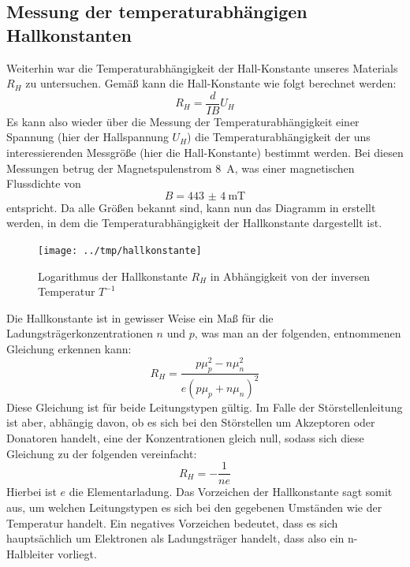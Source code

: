 \subsection{Messung der temperaturabhängigen Hallkonstanten}

Weiterhin war die Temperaturabhängigkeit der Hall-Konstante unseres Materials
$R_H$ zu untersuchen. Gemäß \cite[Gl. (XIV.2)]{ibach} kann die Hall-Konstante
wie folgt berechnet werden: 
\begin{equation}
R_H = \frac{d}{I B} U_H
\end{equation}
Es kann also wieder über die Messung der Temperaturabhängigkeit einer Spannung
(hier der Hallspannung $U_H$) die Temperaturabhängigkeit der uns
interessierenden Messgröße (hier die Hall-Konstante) bestimmt werden. Bei
diesen Messungen betrug der Magnetspulenstrom \SI{8}{\ampere}, was einer
magnetischen Flussdichte von
\begin{equation}
 B=\SI{443(4)}{\milli\tesla}
\end{equation}
entspricht.
Da alle Größen bekannt sind, kann nun das Diagramm in 
erstellt werden, in dem die Temperaturabhängigkeit der Hallkonstante dargestellt ist.
\begin{figure}[htb]
   \centering
   \texttt{[image: ../tmp/hallkonstante]}
   \caption{Logarithmus der Hallkonstante $R_H$ in Abhängigkeit von der inversen Temperatur $T^{-1}$}
   \label{fig:hallkonstante}
\end{figure}

Die Hallkonstante ist in gewisser Weise ein Maß für die
Ladungsträgerkonzentrationen $n$ und $p$, was man an der folgenden, \cite[Gl.
XIV.5]{ibach} entnommenen Gleichung erkennen kann:
\begin{equation}
R_H = \frac{pμ_p^2-nμ_n^2}{e(pμ_p+nμ_n)^2}
\end{equation}
Diese Gleichung ist für beide Leitungstypen gültig. Im Falle der
Störstellenleitung ist aber, abhängig davon, ob es sich bei den Störstellen um
Akzeptoren oder Donatoren handelt, eine der Konzentrationen gleich null, sodass
sich diese Gleichung zu der folgenden vereinfacht:
\begin{equation}
\label{eqn:hallkonst}
R_H = -\frac{1}{ne}
\end{equation}
Hierbei ist $e$ die Elementarladung. Das Vorzeichen der Hallkonstante sagt
somit aus, um welchen Leitungstypen es sich bei den gegebenen Umständen wie
der Temperatur handelt. Ein negatives Vorzeichen bedeutet, dass es sich
hauptsächlich um Elektronen als Ladungsträger handelt, dass also ein
n-Halbleiter vorliegt.

